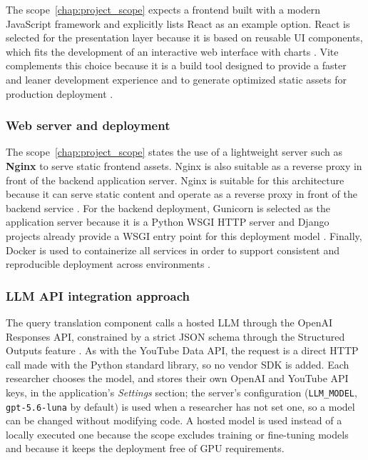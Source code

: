 The scope~\ref{chap:project_scope} expects a frontend built with a modern JavaScript framework and explicitly lists React as an example option. React is selected for the presentation layer because it is based on reusable UI components, which fits the development of an interactive web interface with charts \autocite{react_describing_ui}. Vite complements this choice because it is a build tool designed to provide a faster and leaner development experience and to generate optimized static assets for production deployment \autocite{vite_getting_started}.

\subsubsection{Web server and deployment}

The scope~\ref{chap:project_scope} states the use of a lightweight server such as \textbf{Nginx} to serve static frontend assets. Nginx is also suitable as a reverse proxy in front of the backend application server. Nginx is suitable for this architecture because it can serve static content and operate as a reverse proxy in front of the backend service \autocite{nginx_serving_static_content,nginx_reverse_proxy}. For the backend deployment, Gunicorn is selected as the application server because it is a Python WSGI HTTP server and Django projects already provide a WSGI entry point for this deployment model \autocite{gunicorn_homepage,gunicorn_quickstart}. Finally, Docker is used to containerize all services in order to support consistent and reproducible deployment across environments \autocite{docker_overview}.

\subsubsection{LLM API integration approach}

The query translation component calls a hosted LLM through the OpenAI Responses API, constrained by a strict JSON schema through the Structured Outputs feature \autocite{openai_structured_outputs}. As with the YouTube Data API, the request is a direct HTTP call made with the Python standard library, so no vendor SDK is added. Each researcher chooses the model, and stores their own OpenAI and YouTube API keys, in the application's \emph{Settings} section; the server's configuration (\texttt{LLM\_MODEL}, \texttt{gpt-5.6-luna} by default) is used when a researcher has not set one, so a model can be changed without modifying code. A hosted model is used instead of a locally executed one because the scope excludes training or fine-tuning models and because it keeps the deployment free of GPU requirements.

